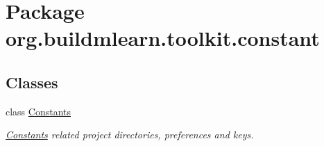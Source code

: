 \hypertarget{namespaceorg_1_1buildmlearn_1_1toolkit_1_1constant}{\section{Package org.\-buildmlearn.\-toolkit.\-constant}
\label{namespaceorg_1_1buildmlearn_1_1toolkit_1_1constant}
}
\subsection*{Classes}
\begin{DoxyCompactItemize}
\item 
class \hyperlink{classorg_1_1buildmlearn_1_1toolkit_1_1constant_1_1Constants}{Constants}
\begin{DoxyCompactList}\small\item\em \hyperlink{classorg_1_1buildmlearn_1_1toolkit_1_1constant_1_1Constants}{Constants} related project directories, preferences and keys. \end{DoxyCompactList}\end{DoxyCompactItemize}
